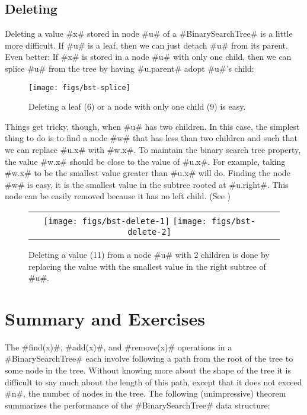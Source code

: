\subsection{Deleting}

Deleting a value #x# stored in node #u# of a #BinarySearchTree# is a
little more difficult.  If #u# is a leaf, then we can just detach #u#
from its parent.  Even better: If #x# is stored in a node #u# with only
one child, then we can splice #u# from the tree by having #u.parent#
adopt #u#'s child:

\begin{figure}
  \begin{center}
    \texttt{[image: figs/bst-splice]}
  \end{center}
  \caption{Deleting a leaf (6) or a node with only one child (9) is easy.}
\end{figure}

Things get tricky, though, when #u# has two children.  In this case,
the simplest thing to do is to find a node #w# that has less than two
children and such that we can replace #u.x# with #w.x#.
To maintain the
binary search tree property, the value #w.x# should be close to the value
of #u.x#.  For example, taking #w.x# to be the smallest value greater
than #u.x# will do.  Finding the node #w# is easy, it is the smallest
value in the subtree rooted at #u.right#.  This node can be easily removed because it has no left child.  (See )

\begin{figure}
  \begin{center}
    \begin{tabular}{cc}
    \texttt{[image: figs/bst-delete-1]}
    \texttt{[image: figs/bst-delete-2]}
    \end{tabular}
  \end{center}
  \caption{Deleting a value (11) from a node #u# with 2 children is done by replacing the value with the smallest value in the right subtree of #u#.}
\end{figure}
\section{Summary and Exercises}

The #find(x)#, #add(x)#, and #remove(x)# operations in a
#BinarySearchTree# each involve following a path from the root of the
tree to some node in the tree. Without knowing more about the shape
of the tree it is difficult to say much about the length of this path,
except that it does not exceed #n#, the number of nodes in the tree.
The following (unimpressive) theorem summarizes the performance of the
#BinarySearchTree# data structure:


